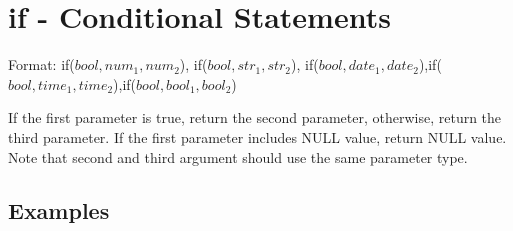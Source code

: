 
%

\section{if - Conditional Statements\label{sect:if}}

Format: if($bool,num_1,num_2$), if($bool,str_1,str_2$), if($bool,date_1,date_2$),if($bool,time_1,time_2$),if($bool,bool_1,bool_2$)

If the first parameter is true, return the second parameter, otherwise, return the third parameter. 
If the first parameter includes NULL value, return NULL value. 
Note that second and third argument should use the same parameter type. 


\subsection*{Examples}


%

